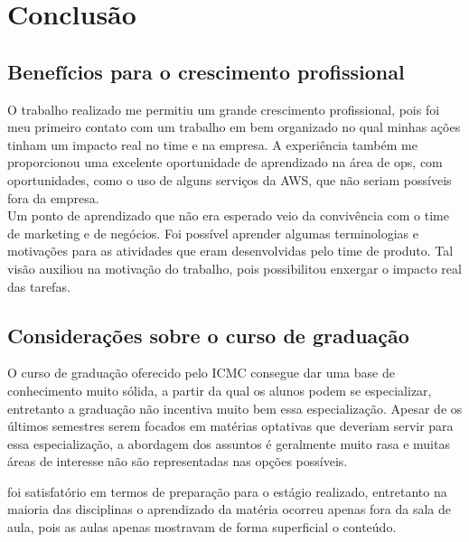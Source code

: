 \chapter{Conclusão}\label{chap:conclusao}


\section{Benefícios para o crescimento profissional}

O trabalho realizado me permitiu um grande crescimento profissional, pois foi meu primeiro contato com um trabalho em bem organizado no qual minhas ações tinham um impacto real no time e na empresa. A experiência também me proporcionou uma excelente oportunidade de aprendizado na área de \gls{ops}, com oportunidades, como o uso de alguns serviços da \gls{AWS}, que não seriam possíveis fora da empresa.\\

Um ponto de aprendizado que não era esperado veio da convivência com o time de marketing e de negócios. Foi possível aprender algumas terminologias e motivações para as atividades que eram desenvolvidas pelo time de produto. Tal visão auxiliou na motivação do trabalho, pois possibilitou enxergar o impacto real das tarefas.

%


\section{Considerações sobre o curso de graduação}

O curso de graduação oferecido pelo \gls{ICMC} consegue dar uma base de conhecimento muito sólida, a partir da qual os alunos podem se especializar, entretanto a graduação não incentiva muito bem essa especialização. Apesar de os últimos semestres serem focados em matérias optativas que deveriam servir para essa especialização, a abordagem dos assuntos é geralmente muito rasa e muitas áreas de interesse não são representadas nas opções possíveis.


foi satisfatório em termos de preparação para o estágio realizado, entretanto na maioria das disciplinas o aprendizado da matéria ocorreu apenas fora da sala de aula, pois as aulas apenas mostravam de forma superficial o conteúdo.\\

